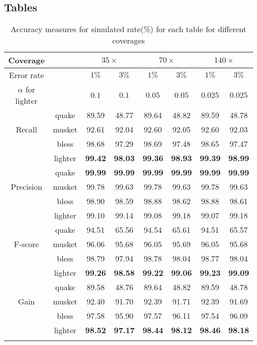 \documentclass{bmcart}
\begin{document}
\begin{backmatter}
\section*{Tables} %
\begin{table}[h!]
\caption{Accuracy measures for simulated  rate(\%) for each table for different coverages}
\begin{tabular}{|c|c|c|c|c|c|c|c|}\hline
Coverage &	& \multicolumn{2}{|c|}{$35\times$}  & \multicolumn{2}{|c|}{$70\times$} & \multicolumn{2}{|c|}{$140\times$} \\ \hline
Error rate & & $1\%$ & $3\%$ & $1\%$ & $3\%$ & $1\%$ & $3\%$ \\ \hline
$\alpha$ for lighter & & $0.1$ & $0.1$ & $0.05$ & $0.05$ & $0.025$ & $0.025$ \\ \hhline{|=|=|=|=|=|=|=|=|}
	& quake	& 89.59	& 48.77	& 89.64	& 48.82	& 89.59	& 48.78 \\ \cline{2-8}
Recall	& musket	& 92.61	& 92.04	& 92.60	& 92.05	& 92.60	& 92.03 \\ \cline{2-8}
	& bless	& 98.68	& 97.29	& 98.69	& 97.48	& 98.65	& 97.47 \\ \cline{2-8}
	& lighter	& \textbf{99.42}	& \textbf{98.03}	& \textbf{99.36}	& \textbf{98.93} & \textbf{99.39}	& \textbf{98.99} \\ \hhline{|=|=|=|=|=|=|=|=|}
	& quake	&\textbf{99.99}	& \textbf{99.99}	& \textbf{99.99}	& \textbf{99.99}	& \textbf{99.99}	& \textbf{99.99} \\ \cline{2-8}
Precision	& musket	& 99.78	& 99.63	& 99.78	& 99.63	& 99.78	& 99.63 \\ \cline{2-8}
	& bless	& 98.90	& 98.59	& 98.88	& 98.62	& 98.88	& 98.61 \\ \cline{2-8}
	& lighter	& 99.10 & 99.14	& 99.08	& 99.18	& 99.07	& 99.18 \\ \hhline{|=|=|=|=|=|=|=|=|}
	& quake	& 94.51	& 65.56	& 94.54	& 65.61	& 94.51	& 65.57 \\ \cline{2-8}
F-score	& musket	& 96.06	& 95.68	& 96.05	& 95.69	& 96.05	& 95.68 \\ \cline{2-8}
	& bless	& 98.79	& 97.94	& 98.78	& 98.04	& 98.77	& 98.04 \\ \cline{2-8}
	& lighter	& \textbf{99.26}	& \textbf{98.58}	& \textbf{99.22}	& \textbf{99.06}	& \textbf{99.23}	& \textbf{99.09} \\ \hhline{|=|=|=|=|=|=|=|=|}
	& quake	& 89.58	& 48.76	& 89.64	& 48.82	& 89.59	& 48.78 \\ \cline{2-8}
Gain	& musket	& 92.40	& 91.70	& 92.39	& 91.71	& 92.39	& 91.69 \\ \cline{2-8}
	& bless	& 97.58	& 95.90	& 97.57	& 96.11	& 97.54	& 96.09 \\ \cline{2-8}
	& lighter	& \textbf{98.52}	& \textbf{97.17}	& \textbf{98.44}	& \textbf{98.12}	& \textbf{98.46}	& \textbf{98.18} \\ \hhline{|=|=|=|=|=|=|=|=|}


\end{tabular}
\end{table}
\end{backmatter}
\end{document}
